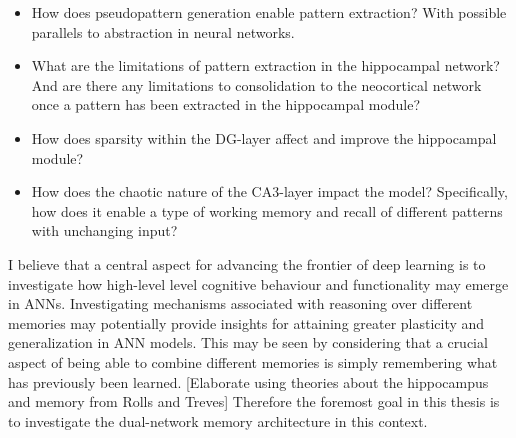 \begin{itemize}
\item How does pseudopattern generation enable pattern extraction? With possible parallels to abstraction in neural networks.
\item What are the limitations of pattern extraction in the hippocampal network? And are there any limitations to consolidation to the neocortical network once a pattern has been extracted in the hippocampal module?
\item How does sparsity within the DG-layer affect and improve the hippocampal module?
\item How does the chaotic nature of the CA3-layer impact the model? Specifically, how does it enable a type of working memory and recall of different patterns with unchanging input?
\end{itemize}

I believe that a central aspect for advancing the frontier of deep learning is to investigate how high-level level cognitive behaviour and functionality may emerge in ANNs. Investigating mechanisms associated with reasoning over different memories may potentially provide insights for attaining greater plasticity and generalization in ANN models. This may be seen by considering that a crucial aspect of being able to combine different memories is simply remembering what has previously been learned. [Elaborate using theories about the hippocampus and memory from Rolls and Treves] Therefore the foremost goal in this thesis is to investigate the dual-network memory architecture in this context.

